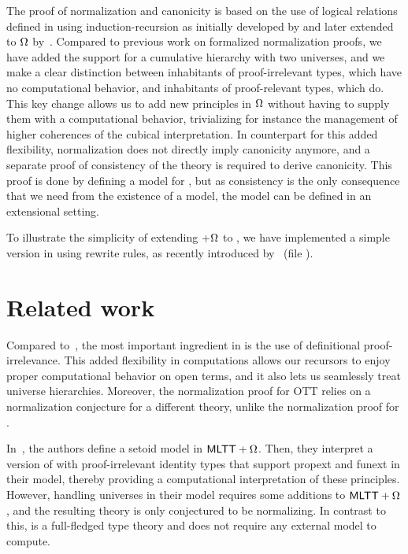 The proof of normalization and canonicity is based on the use
of logical relations defined in \Agda using induction-recursion as
initially developed by  and later extended to
$\Omega$ by~.
%
Compared to previous work on formalized normalization proofs, we have added the support
for a cumulative hierarchy with two universes, and we make a clear distinction
between inhabitants of proof-irrelevant types, which have no computational
behavior, and inhabitants of proof-relevant types, which do.
%
This key change allows us to add new principles in $\Omega$ without
having to supply them with a computational behavior, trivializing for
instance the management of higher coherences of the cubical interpretation.
%
In counterpart for this added flexibility, normalization does not directly
imply canonicity anymore, and a separate proof of consistency of the
theory is required to derive canonicity.
%
This proof is done by defining a model for \SetoidTT, but as
consistency is the only consequence that we need from the existence of
a model, the model can be defined in an extensional setting.

To illustrate the simplicity of extending \MLTT+$\Omega$ to \SetoidTT,
we have implemented a simple version in
\Agda using rewrite rules, as recently introduced
by~ (file ).

\section{Related work}

Compared to~, the most important ingredient in \SetoidTT is the
use of definitional proof-irrelevance.
%
This added flexibility in computations allows our recursors to enjoy proper computational
behavior on open terms, and it also lets us seamlessly treat universe hierarchies.
%
Moreover, the normalization proof for OTT relies on a normalization conjecture for a different
theory, unlike the normalization proof for \SetoidTT.

In~, the authors define a setoid model in \( \mathsf{MLTT}+\Omega \). Then, they
interpret a version of \MLTT with proof-irrelevant identity types that support propext and
funext in their model, thereby providing a computational interpretation of these principles.
%
However, handling universes in their model requires some additions to \( \mathsf{MLTT}+\Omega \), and
the resulting theory is only conjectured to be normalizing.
%
In contrast to this, \SetoidTT is a full-fledged type theory and does not require any external
model to compute.


